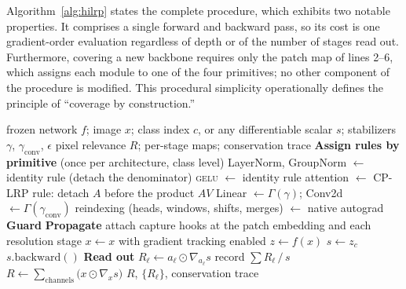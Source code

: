 \documentclass[lettersize,journal]{IEEEtran}
\theoremstyle{definition}
\theoremstyle{plain}
\begin{document}
Algorithm~\ref{alg:hilrp} states the complete procedure, which exhibits two
notable properties. It comprises a single forward and backward pass, so its cost
is one gradient-order evaluation regardless of depth or of the number of stages
read out. Furthermore, covering a new backbone requires only the patch map of
lines 2--6, which assigns each module to one of the four primitives; no other
component of the procedure is modified. This procedural simplicity operationally defines the principle of ``coverage by construction.''

\begin{algorithm}[t]
\caption{HiLRP attribution}
\label{alg:hilrp}
\begin{algorithmic}[1]
\Require frozen network $f$; image $x$; class index $c$, or any differentiable
         scalar $s$; stabilizers $\gamma$, $\gamma_{\text{conv}}$, $\epsilon$
\Ensure  pixel relevance $R$; per-stage maps; conservation trace
\Statex \textbf{Assign rules by primitive} (once per architecture, class level)
\State LayerNorm, GroupNorm $\gets$ identity rule (detach the denominator)
\State \textsc{gelu} $\gets$ identity rule
\State attention $\gets$ CP-LRP rule: detach $A$ before the product $A V$
\State Linear $\gets \Gamma(\gamma)$; \; Conv2d $\gets \Gamma(\gamma_{\text{conv}})$
\State reindexing (heads, windows, shifts, merges) $\gets$ native autograd
\Statex \textbf{Guard}
\State {} 
\Statex \textbf{Propagate}
\State attach capture hooks at the patch embedding and each resolution stage
\State $x \gets x$ with gradient tracking enabled
\State $z \gets f(x)$
\State $s \gets z_c$ 
\State $s.\textrm{backward}()$
\Statex \textbf{Read out}
  \State $R_\ell \gets a_\ell \odot \nabla_{a_\ell} s$
  \State record $\textstyle\sum R_\ell \,/\, s$ 
\EndFor
\State $R \gets \sum_{\text{channels}} \big(x \odot \nabla_x s\big)$
\State \Return $R$, $\{R_\ell\}$, conservation trace
\end{algorithmic}
\end{algorithm}
\end{document}
